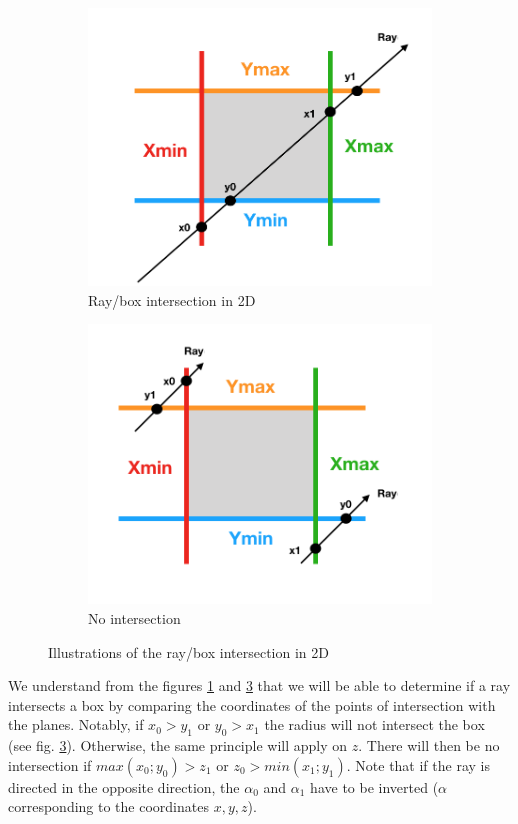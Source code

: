 \documentclass[AMA,STIX1COL]{WileyNJD-v2}
\begin{document}
\begin{figure}
\centering
	\begin{subfigure}{0.4\textwidth}
		\includegraphics[width=\linewidth]{AABB}
		\caption{Ray/box intersection in 2D}
		\label{AABB}
	\end{subfigure}
	\qquad
	\begin{subfigure}{0.4\textwidth}
		\includegraphics[width=\linewidth]{AABB2}
		\caption{No intersection}
		\label{AABB2}
	\end{subfigure}
	\caption{Illustrations of the ray/box intersection in 2D}
\end{figure}
%
We understand from the figures \ref{AABB} and \ref{AABB2} that we will be able to determine if a ray intersects a box by comparing the coordinates of the points of intersection with the planes. Notably, if $x_0 > y_1$ or $y_0 > x_1$ the radius will not intersect the box (see fig. \ref{AABB2}). Otherwise, the same principle will apply on $z$. There will then be no intersection if $max(x_0 ; y_0) > z_1$ or $ z_0 > min(x_1 ; y_1)$. Note that if the ray is directed in the opposite direction, the $\alpha_0$ and $\alpha_1$ have to be inverted ($\alpha$ corresponding to the coordinates $x,y,z$).
\end{document}
